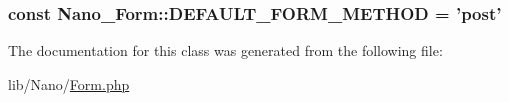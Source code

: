 \hypertarget{classNano__Form_67b6658589824e3752dca005237f5915}{
\subsubsection[{DEFAULT\_\-FORM\_\-METHOD}]{\setlength{\rightskip}{0pt plus 5cm}const {\bf Nano\_\-Form::DEFAULT\_\-FORM\_\-METHOD} = 'post'}}
\label{classNano__Form_67b6658589824e3752dca005237f5915}




The documentation for this class was generated from the following file:\begin{CompactItemize}
\item 
lib/Nano/\hyperlink{Form_8php}{Form.php}\end{CompactItemize}
